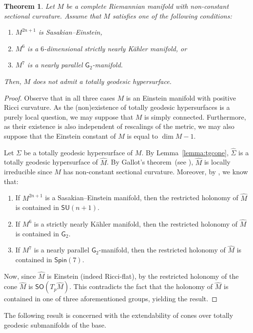 \documentclass[11pt,a4paper,final]{amsart}
\newcommand{\s}{\mathsf}
\renewcommand{\hat}{\widehat}
\newtheorem{theorem}{Theorem}[section]
\theoremstyle{definition}
\begin{document}
\begin{theorem}
\label{th:hyp}
Let $M$ be a complete Riemannian manifold with non-constant sectional curvature. Assume that $M$ satisfies one of the following conditions:
\begin{enumerate}[\rm (i)]
	\item $M^{2n+1}$ is Sasakian--Einstein,
	\item $M^6$ is a $6$-dimensional strictly nearly Kähler manifold, or
	\item $M^7$ is a nearly parallel $\s{G}_2$-manifold.
\end{enumerate}
Then, $M$ does not admit a totally geodesic hypersurface.
\end{theorem}
\begin{proof}
Observe that in all three cases $M$ is an Einstein manifold with positive Ricci curvature.
As the (non)existence of totally geodesic hypersurfaces is a purely local question, we may suppose that $M$ is simply connected.
Furthermore, as their existence is also independent of rescalings of the metric, we may also suppose that the Einstein constant of $M$ is equal to $\dim M - 1$.

Let $\Sigma$ be a totally geodesic hypersurface of $M$. By Lemma~\ref{lemma:tgcone}, $\hat{\Sigma}$ is a totally geodesic hypersurface of $\hat{M}$. By Gallot's theorem~(see \cite{gallot}), $\hat{M}$ is locally irreducible since $M$ has non-constant sectional curvature. Moreover, by \cite{bar}, we know that:
\begin{enumerate}[\rm (i)]
	\item If $M^{2n+1}$ is a Sasakian--Einstein manifold, then the restricted holonomy of $\hat{M}$ is contained in $\s{SU}(n+1)$.
	\item If $M^6$ is a strictly nearly Kähler manifold, then the restricted holonomy of $\hat{M}$ is contained in $\s{G}_{2}$.
	\item If $M^7$ is a nearly parallel $\s{G}_2$-manifold, then the restricted holonomy of $\hat{M}$ is contained  in $\s{Spin}(7)$.
\end{enumerate}
Now, since $\hat{M}$ is Einstein (indeed Ricci-flat), by  \cite[Theorem 4.3]{JentschMoroianuSemmelmann} the restricted holonomy of the cone $\hat{M}$ is $\s{SO}(T_p \hat{M})$.  This contradicts the fact that the holonomy of $\hat{M}$ is contained in one of three aforementioned groups, yielding the result.
\end{proof}

The following result is concerned with the extendability of cones over totally geodesic submanifolds of the base.
\end{document}
